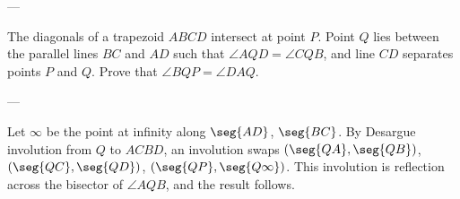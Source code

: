 
---

The diagonals of a trapezoid $ABCD$ intersect at point $P$. Point $Q$ lies between the parallel lines $BC$ and $AD$ such that $\angle AQD=\angle CQB$, and line $CD$ separates points $P$ and $Q$. Prove that $\angle BQP=\angle DAQ$.

---

Let $\infty$ be the point at infinity along $\seg{AD}$, $\seg{BC}$. By Desargue involution from $Q$ to $ACBD$, an involution swaps $(\seg{QA},\seg{QB})$, $(\seg{QC},\seg{QD})$, $(\seg{QP},\seg{Q\infty})$. This involution is reflection across the bisector of $\angle AQB$, and the result follows.


